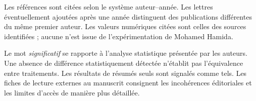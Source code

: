 \documentclass[11pt,a4paper]{article}
\begin{document}
\vspace{0.7cm}
Les références sont citées selon le système auteur--année. Les lettres éventuellement ajoutées après une année distinguent des publications différentes du même premier auteur. Les valeurs numériques citées sont celles des sources identifiées ; aucune n'est issue de l'expérimentation de Mohamed Hamida.

Le mot \textit{significatif} se rapporte à l'analyse statistique présentée par les auteurs. Une absence de différence statistiquement détectée n'établit pas l'équivalence entre traitements. Les résultats de résumés seuls sont signalés comme tels. Les fiches de lecture externes au manuscrit consignent les incohérences éditoriales et les limites d'accès de manière plus détaillée.
\clearpage
{}










\clearpage
{}
\renewcommand{\bibfont}{\small}
\setlength{\bibsep}{3pt}


\end{document}
